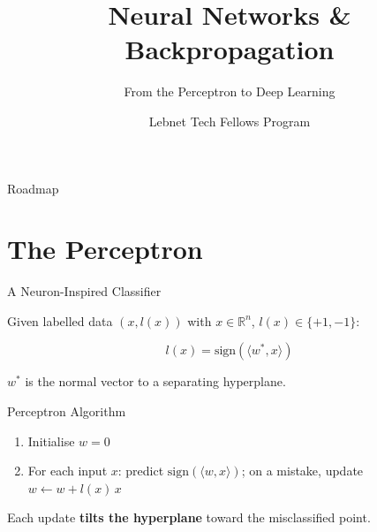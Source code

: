 \documentclass[aspectratio=169, professionalfonts]{beamer}
\title{Neural Networks \& Backpropagation}
\subtitle{From the Perceptron to Deep Learning}
\author{Lebnet Tech Fellows Program}
\date{}
\def\R{\mathbb{R}}
\begin{document}
\begin{frame}
\titlepage
\end{frame}

\begin{frame}{Roadmap}
\tableofcontents
\end{frame}

\section{The Perceptron}

\begin{frame}{A Neuron-Inspired Classifier}

Given labelled data $(x, l(x))$ with $x \in \R^n$, $l(x) \in \{+1,-1\}$:

$$l(x) = \text{sign}(\langle w^*, x \rangle)$$

$w^*$ is the normal vector to a separating hyperplane.

\bigskip

\begin{block}{Perceptron Algorithm}
\begin{enumerate}
  \item Initialise $w = 0$
  \item For each input $x$:
    predict $\text{sign}(\langle w, x \rangle)$;
    on a mistake, update $w \leftarrow w + l(x)\,x$
\end{enumerate}
\end{block}

\bigskip

Each update \textbf{tilts the hyperplane} toward the misclassified point.

\end{frame}
\end{document}
